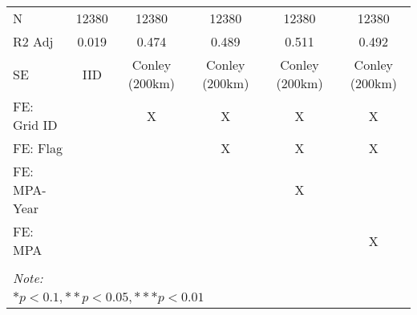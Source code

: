 \begin{table}
\begin{tabular}[t]{lccccc}
\hspace{1em}N & 12380 & 12380 & 12380 & 12380 & 12380\\
\hspace{1em}R2 Adj & 0.019 & 0.474 & 0.489 & 0.511 & 0.492\\
\hspace{1em}SE & IID & Conley (200km) & Conley (200km) & Conley (200km) & Conley (200km)\\
\midrule
FE: Grid ID &  & X & X & X & X\\
FE: Flag &  &  & X & X & X\\
FE: MPA-Year &  &  &  & X & \\
FE: MPA &  &  &  &  & X\\
\midrule\\
\bottomrule
\multicolumn{6}{l}{\rule{0pt}{1em}\textit{Note: }}\\
\multicolumn{6}{l}{\rule{0pt}{1em}$* p < 0.1, ** p < 0.05, *** p < 0.01$}\\
\end{tabular}
\end{table}
